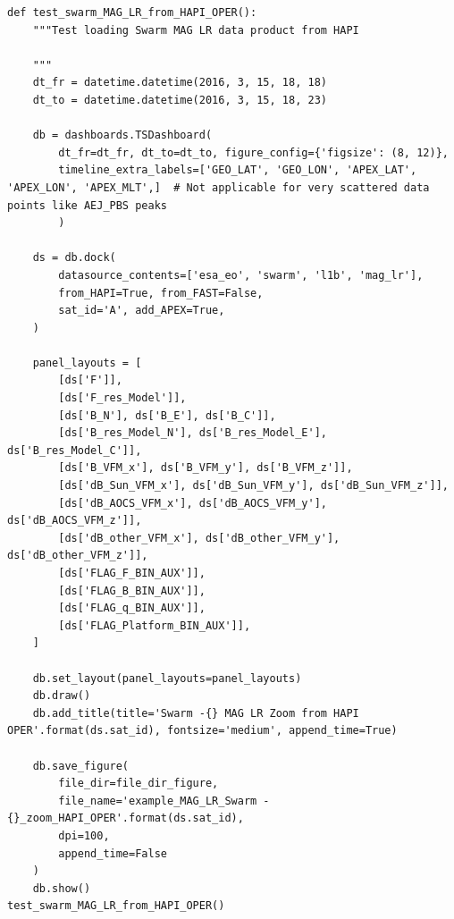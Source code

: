 \begin{verbatim}
def test_swarm_MAG_LR_from_HAPI_OPER():
    """Test loading Swarm MAG LR data product from HAPI

    """
    dt_fr = datetime.datetime(2016, 3, 15, 18, 18)
    dt_to = datetime.datetime(2016, 3, 15, 18, 23)    
    
    db = dashboards.TSDashboard(
        dt_fr=dt_fr, dt_to=dt_to, figure_config={'figsize': (8, 12)},
        timeline_extra_labels=['GEO_LAT', 'GEO_LON', 'APEX_LAT', 'APEX_LON', 'APEX_MLT',]  # Not applicable for very scattered data points like AEJ_PBS peaks
        )

    ds = db.dock(
        datasource_contents=['esa_eo', 'swarm', 'l1b', 'mag_lr'], 
        from_HAPI=True, from_FAST=False,
        sat_id='A', add_APEX=True,
    )

    panel_layouts = [
        [ds['F']],
        [ds['F_res_Model']],
        [ds['B_N'], ds['B_E'], ds['B_C']],
        [ds['B_res_Model_N'], ds['B_res_Model_E'], ds['B_res_Model_C']],
        [ds['B_VFM_x'], ds['B_VFM_y'], ds['B_VFM_z']],
        [ds['dB_Sun_VFM_x'], ds['dB_Sun_VFM_y'], ds['dB_Sun_VFM_z']],
        [ds['dB_AOCS_VFM_x'], ds['dB_AOCS_VFM_y'], ds['dB_AOCS_VFM_z']],
        [ds['dB_other_VFM_x'], ds['dB_other_VFM_y'], ds['dB_other_VFM_z']],
        [ds['FLAG_F_BIN_AUX']],
        [ds['FLAG_B_BIN_AUX']],
        [ds['FLAG_q_BIN_AUX']],
        [ds['FLAG_Platform_BIN_AUX']],
    ]

    db.set_layout(panel_layouts=panel_layouts)
    db.draw()
    db.add_title(title='Swarm -{} MAG LR Zoom from HAPI OPER'.format(ds.sat_id), fontsize='medium', append_time=True)
    
    db.save_figure(
        file_dir=file_dir_figure, 
        file_name='example_MAG_LR_Swarm -{}_zoom_HAPI_OPER'.format(ds.sat_id), 
        dpi=100, 
        append_time=False
    )
    db.show()
test_swarm_MAG_LR_from_HAPI_OPER()
\end{verbatim}

